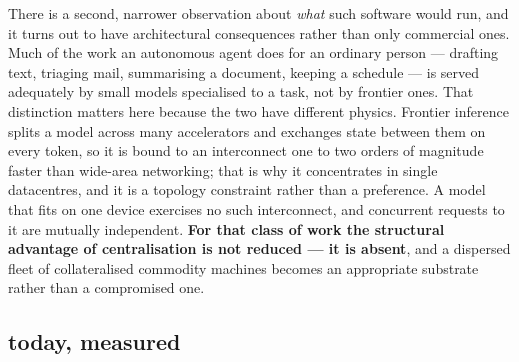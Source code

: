 There is a second, narrower observation about \emph{what} such software would run, and it turns out to
have architectural consequences rather than only commercial ones. Much of the work an autonomous agent
does for an ordinary person --- drafting text, triaging mail, summarising a document, keeping a
schedule --- is served adequately by small models specialised to a task, not by frontier ones. That
distinction matters here because the two have different physics. Frontier inference splits a model
across many accelerators and exchanges state between them on every token, so it is bound to an
interconnect one to two orders of magnitude faster than wide-area networking; that is why it
concentrates in single datacentres, and it is a topology constraint rather than a preference. A model
that fits on one device exercises no such interconnect, and concurrent requests to it are mutually
independent. \textbf{For that class of work the structural advantage of centralisation is not reduced
--- it is absent}, and a dispersed fleet of collateralised commodity machines becomes an appropriate
substrate rather than a compromised one. 

\subsection{\Flux today, measured}
\label{sec:intro-today}

